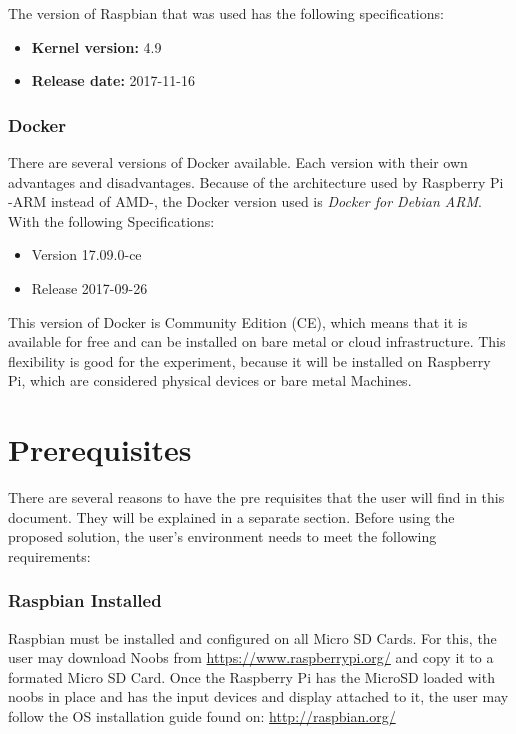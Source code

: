 The version of Raspbian that was used has the following specifications:
	
\begin{itemize}
	\item 	\textbf{Kernel version:} 4.9
	\item 	\textbf{Release date:} 2017-11-16
\end{itemize}
	
\subsubsection{Docker}

There are several versions of Docker available. Each version with
their own advantages and disadvantages. Because of the architecture
used by Raspberry Pi -ARM instead of AMD-, the Docker version used is
\textit{Docker for Debian ARM}. With the following
Specifications:
	
\begin{itemize}
	\item Version 17.09.0-ce
	\item Release 2017-09-26
\end{itemize}
	
This version of Docker is Community Edition (CE), which means that it
is available for free and can be installed on bare metal or cloud
infrastructure. This flexibility is good for the experiment, because
it will be installed on Raspberry Pi, which are considered physical
devices or bare metal Machines.  \cite{dockerdoc2017}
	
\section{Prerequisites}
	
There are several reasons to have the pre requisites that the user
will find in this document. They will be explained in a separate
section. Before using the proposed solution, the user’s environment
needs to meet the following requirements:
	
\subsubsection{Raspbian Installed}

Raspbian must be installed and configured on all Micro SD Cards.  For
this, the user may download Noobs from
\url{https://www.raspberrypi.org/} and copy it to a
formated Micro SD Card.  Once the Raspberry Pi has the MicroSD loaded
with noobs in place and has the input devices and display attached to
it, the user may follow the OS installation guide found on:
\url{http://raspbian.org/}
	
